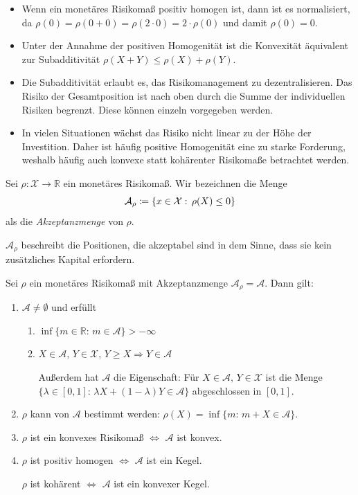 \documentclass[a4paper,twoside,DIV15,BCOR12mm]{scrbook}
\begin{document}
\begin{bemerkung}
\begin{itemize}
\item Wenn ein monetäres Risikomaß positiv homogen ist, dann ist es normalisiert, da $\rho(0)=\rho(0+0)=\rho(2\cdot 0)=2\cdot \rho(0)$ und damit $\rho(0)=0$.
\item Unter der Annahme der positiven Homogenität ist die Konvexität äquivalent zur Subadditivität $\rho(X+Y)\leq \rho(X)+\rho (Y)$.
\item Die Subadditivität erlaubt es, das Risikomanagement zu dezentralisieren. Das Risiko der Gesamtposition ist nach oben durch die Summe der individuellen Risiken begrenzt. Diese können einzeln vorgegeben werden.
\item In vielen Situationen wächst das Risiko nicht linear zu der Höhe der Investition. Daher ist häufig positive Homogenität eine zu starke Forderung, weshalb häufig auch konvexe statt kohärenter Risikomaße betrachtet werden.
\end{itemize}
\end{bemerkung}

\begin{definition}
Sei $\rho:\mathcal{X}\to\mathbb{R}$ ein monetäres Risikomaß. Wir bezeichnen die Menge
\[
\mathcal{A}_\rho\da\{x\in \mathcal{X}:\, \rho(X)\leq 0\}
\]
als die \emph{Akzeptanzmenge} von $\rho$.

$\mathcal{A}_\rho$ beschreibt die Positionen, die akzeptabel sind in dem Sinne, dass sie kein zusätzliches Kapital erfordern.
\end{definition}

\begin{satz}
Sei $\rho$ ein monetäres Risikomaß mit Akzeptanzmenge $\mathcal{A}_\rho=\mathcal{A}$. Dann gilt:
\begin{enumerate}
\item $\mathcal{A}\neq\emptyset$ und erfüllt

\begin{enumerate}
\item $\inf\{m\in\mathbb{R}:\, m\in\mathcal{A}\}>-\infty$
\item $X\in\mathcal{A},\, Y\in\mathcal{X}, \, Y\geq X \Rightarrow Y\in\mathcal{A}$

Außerdem hat $\mathcal{A}$ die Eigenschaft: Für $X\in\mathcal{A},\, Y\in\mathcal{X}$ ist die Menge $\{\lambda\in[0, 1]:\, \lambda X+(1-\lambda) Y\in\mathcal{A}\}$ abgeschlossen in $[0, 1]$.
\end{enumerate}

\item $\rho$ kann von $\mathcal{A}$ bestimmt werden: $\rho(X)=\inf\{m:\, m+X\in\mathcal{A}\}$.
\item $\rho$ ist ein konvexes Risikomaß $\Leftrightarrow$ $\mathcal{A}$ ist konvex.
\item $\rho$ ist positiv homogen $\Leftrightarrow$ $\mathcal{A}$ ist ein Kegel.

$\rho$ ist kohärent $\Leftrightarrow$ $\mathcal{A}$ ist ein konvexer Kegel.
\end{enumerate}
\end{satz}
\end{document}
